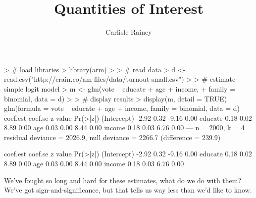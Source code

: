 \documentclass[handout]{beamer}
\begin{document}
\title{Quantities of Interest}   
\author{Carlisle Rainey} 
\date{} %

\frame{\titlepage} 


\begin{frame}[fragile]
\begin{footnotesize}
\begin{blockcode}
> # load libraries
> library(arm)
> 
> # read data
> d <- read.csv("http://crain.co/am-files/data/turnout-small.csv")
> 
> # estimate simple logit model
> m <- glm(vote ~ educate + age + income, 
+          family = binomial, data = d)
> 
> # display results
> display(m, detail = TRUE)
glm(formula = vote ~ educate + age + income, family = binomial, 
    data = d)
            coef.est coef.se z value Pr(>|z|)
(Intercept) -2.92     0.32   -9.16    0.00   
educate      0.18     0.02    8.89    0.00   
age          0.03     0.00    8.44    0.00   
income       0.18     0.03    6.76    0.00   
---
  n = 2000, k = 4
  residual deviance = 2026.9, null deviance = 2266.7 (difference = 239.9)
\end{blockcode}
\end{footnotesize}
\end{frame}

\begin{frame}[fragile]
\begin{Large}
\begin{blockcode}
            coef.est coef.se z value Pr(>|z|)
(Intercept) -2.92     0.32   -9.16    0.00   
educate      0.18     0.02    8.89    0.00   
age          0.03     0.00    8.44    0.00   
income       0.18     0.03    6.76    0.00  
\end{blockcode}
\end{Large}\vspace{8mm}
We've fought so long and hard for these estimates, what do we do with them? We've got sign-and-significance, but that tells us way less than we'd like to know.
\end{frame}
\end{document}
